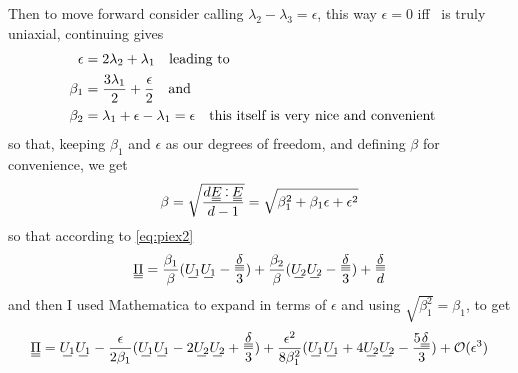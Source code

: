 \documentclass[11pt]{article}
\begin{document}
Then to move forward consider calling $\lambda_2-\lambda_3=\epsilon$, this way $\epsilon=0$ iff \EE\ is truly uniaxial, continuing gives
\begin{align}
    \epsilon &= 2\lambda_2 +\lambda_1 \qq{leading to} \\
    \beta_1 &= \frac{3\lambda_1}{2} + \frac{\epsilon}{2} \qq{and} \\
    \beta_2 &= \lambda_1 + \epsilon - \lambda_1 = \epsilon \qq{this itself is very nice and convenient}
\end{align}
\noindent{}
so that, keeping $\beta_1$ and $\epsilon$ as our degrees of freedom, and defining $\beta$ for convenience, we get
\begin{equation}
    \beta = \sqrt{\frac{d\du{E}\cddot\du{E}}{d-1}} = \sqrt{\beta_1^2+\beta_1\epsilon+\epsilon^2}
\end{equation}
so that according to \cref{eq:piex2}
\begin{equation}
    \du{\Pi} = \frac{\beta_1}{\beta}(\su{U_1}\su{U_1} - \frac{\du{\delta}}{3}) + \frac{\beta_2}{\beta}(\su{U_2}\su{U_2} - \frac{\du{\delta}}{3}) + \frac{\du{\delta}}{d}
\end{equation}
and then I used Mathematica to expand in terms of $\epsilon$ and using $\sqrt{\beta_1^2}=\beta_1$, to get
\begin{equation}
    \du{\Pi} = \su{U_1}\su{U_1} - \frac{\epsilon}{2\beta_1}(\su{U_1}\su{U_1} - 2\su{U_2}\su{U_2} + \frac{\du{\delta}}{3}) + \frac{\epsilon^2}{8\beta_1^2}(\su{U_1}\su{U_1} + 4\su{U_2}\su{U_2} - \frac{5\du{\delta}}{3}) + \mathcal{O}(\epsilon^3)
\end{equation}
\end{document}
